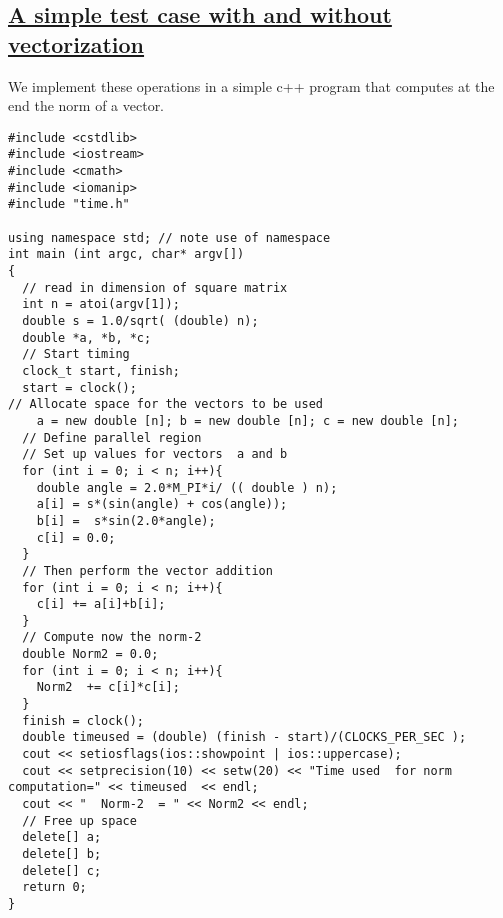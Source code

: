\noindent
\subsection*{\href{{https://github.com/CompPhysics/ComputationalPhysicsMSU/blob/master/doc/Programs/LecturePrograms/programs/Classes/cpp/program7.cpp}}{A simple test case with and without vectorization}}
We implement these operations in a simple c++ program that computes at the end the norm of a vector.




















































\begin{Verbatim}[numbers=none,fontsize=\fontsize{9pt}{9pt},baselinestretch=0.95]
#include <cstdlib>
#include <iostream>
#include <cmath>
#include <iomanip>
#include "time.h"

using namespace std; // note use of namespace
int main (int argc, char* argv[])
{
  // read in dimension of square matrix
  int n = atoi(argv[1]);
  double s = 1.0/sqrt( (double) n);
  double *a, *b, *c;
  // Start timing
  clock_t start, finish;
  start = clock();
// Allocate space for the vectors to be used
    a = new double [n]; b = new double [n]; c = new double [n];
  // Define parallel region
  // Set up values for vectors  a and b
  for (int i = 0; i < n; i++){
    double angle = 2.0*M_PI*i/ (( double ) n);
    a[i] = s*(sin(angle) + cos(angle));
    b[i] =  s*sin(2.0*angle);
    c[i] = 0.0;
  }
  // Then perform the vector addition
  for (int i = 0; i < n; i++){
    c[i] += a[i]+b[i];
  }
  // Compute now the norm-2
  double Norm2 = 0.0;
  for (int i = 0; i < n; i++){
    Norm2  += c[i]*c[i];
  }
  finish = clock();
  double timeused = (double) (finish - start)/(CLOCKS_PER_SEC );
  cout << setiosflags(ios::showpoint | ios::uppercase);
  cout << setprecision(10) << setw(20) << "Time used  for norm computation=" << timeused  << endl;
  cout << "  Norm-2  = " << Norm2 << endl;
  // Free up space
  delete[] a;
  delete[] b;
  delete[] c;
  return 0;
}





\end{Verbatim}


